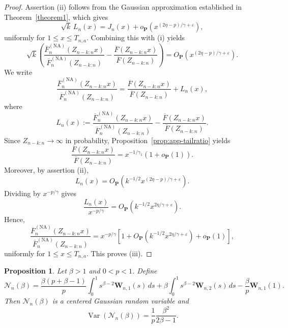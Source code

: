 \documentclass[reqno,openbib,runningheads,a4paper,12pt]{amsart}%
\newtheorem{proposition}{Proposition}[section]
\begin{document}
\begin{proof}
\noindent Assertion (ii) follows from the Gaussian approximation established
in Theorem~\ref{theorem1}, which gives
\[
\sqrt{k}\,L_{n}(x)=J_{n}(x)+o_{\mathbf{P}}\!\left(  x^{(2\eta-p)/\gamma
+\varepsilon}\right)  ,
\]
uniformly for $1\leq x\leq T_{n,a}$. Combining this with (i) yields
\[
\sqrt{k}\left(  \frac{\overline{F}_{n}^{(\mathrm{NA})}(Z_{n-k:n}x)}%
{\overline{F}_{n}^{(\mathrm{NA})}(Z_{n-k:n})}-\frac{\overline{F}(Z_{n-k:n}%
x)}{\overline{F}(Z_{n-k:n})}\right)  =O_{\mathbf{P}}\!\left(  x^{(2\eta
-p)/\gamma+\varepsilon}\right)  .
\]
We write
\[
\frac{\overline{F}_{n}^{(\mathrm{NA})}(Z_{n-k:n}x)}{\overline{F}%
_{n}^{(\mathrm{NA})}(Z_{n-k:n})}=\frac{\overline{F}(Z_{n-k:n}x)}{\overline
{F}(Z_{n-k:n})}+L_{n}(x),
\]
where
\[
L_{n}(x):=\frac{\overline{F}_{n}^{(\mathrm{NA})}(Z_{n-k:n}x)}{\overline{F}%
_{n}^{(\mathrm{NA})}(Z_{n-k:n})}-\frac{\overline{F}(Z_{n-k:n}x)}{\overline
{F}(Z_{n-k:n})}.
\]
Since $Z_{n-k:n}\rightarrow\infty$ in probability,
Proposition~\ref{prop:app-tailratio} yields
\[
\frac{\overline{F}(Z_{n-k:n}x)}{\overline{F}(Z_{n-k:n})}=x^{-1/\gamma_{1}%
}\left(  1+o_{\mathbf{P}}(1)\right)  .
\]
Moreover, by assertion (ii),
\[
L_{n}(x)=O_{\mathbf{P}}\!\left(  k^{-1/2}x^{(2\eta-p)/\gamma+\varepsilon
}\right)  .
\]
Dividing by $x^{-p/\gamma}$ gives
\[
\frac{L_{n}(x)}{x^{-p/\gamma}}=O_{\mathbf{P}}\!\left(  k^{-1/2}x^{2\eta
/\gamma+\varepsilon}\right)  .
\]
Hence,
\[
\frac{\overline{F}_{n}^{(\mathrm{NA})}(Z_{n-k:n}x)}{\overline{F}%
_{n}^{(\mathrm{NA})}(Z_{n-k:n})}=x^{-p/\gamma}\left[  1+O_{\mathbf{P}%
}\!\left(  k^{-1/2}x^{2\eta/\gamma+\varepsilon}\right)  +o_{\mathbf{P}%
}(1)\right]  ,
\]
uniformly for $1\leq x\leq T_{n,a}$. This proves (iii).
\end{proof}

\begin{proposition}
\label{prop:app-gaussian} Let $\beta>1$ and $0<p<1$. Define
\[
\mathcal{N}_{n}(\beta) = \frac{\beta(p+\beta-1)}{p} \int_{0}^{1}s^{\beta
-2}\mathbf{W}_{n,1}(s)\,ds + \beta\int_{0}^{1}s^{\beta-2}\mathbf{W}%
_{n,2}(s)\,ds - \frac{\beta}{p}\mathbf{W}_{n,1}(1).
\]
Then $\mathcal{N}_{n}(\beta)$ is a centered Gaussian random variable and
\[
\operatorname{Var}\!\left(  \mathcal{N}_{n}(\beta)\right)  = \frac{1}{p}%
\frac{\beta^{2}}{2\beta-1}.
\]

\end{proposition}
\end{document}
